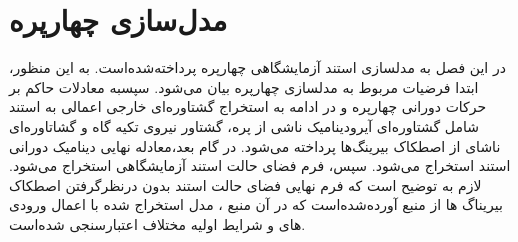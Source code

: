 \chapter{مدل‌سازی چهارپره}
 در این فصل به مدلسازی استند آزمایشگاهی چهارپره پرداخته‌شده‌است. به این منظور، ابتدا فرضیات مربوط به 
 مدلسازی چهارپره بیان می‌شود. سپسبه معادلات حاکم بر حرکات 
 دورانی چهارپره و در ادامه به استخراج گشتاوره‌ای خارجی اعمالی 
 به استند شامل گشتاوره‌ای آیرودینامیک ناشی از پره، گشتاور نیروی تکیه گاه و گشاتاوره‌ای ناشای از 
 اصطکاک بیرینگ‌ها پرداخته می‌شود. در گام بعد،معادله نهایی دینامیک دورانی استند 
 استخراج می‌شود. سپس، فرم فضای حالت استند آزمایشگاهی استخراج می‌شود. لازم به 
 توضیح است که فرم نهایی فضای حالت استند بدون درنظرگرفتن اصطکاک بیریناگ ها از منبع
 \cite{Abeshtan}
 آورده‌شده‌است که در آن منبع ، مدل استخراج شده با اعمال ورودی های و شرایط اولیه مختلاف 
 اعتبارسنجی شده‌است.